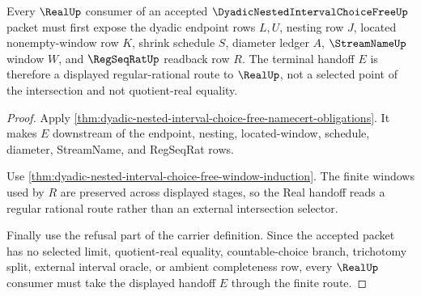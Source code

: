 \begin{theorem}\label{thm:dyadic-nested-interval-choice-free-real-handoff}
Every $\RealUp$ consumer of an accepted $\DyadicNestedIntervalChoiceFreeUp$ packet must first expose the dyadic endpoint rows $L,U$, nesting row $J$, located nonempty-window row $K$, shrink schedule $S$, diameter ledger $A$, $\StreamNameUp$ window $W$, and $\RegSeqRatUp$ readback row $R$. The terminal handoff $E$ is therefore a displayed regular-rational route to $\RealUp$, not a selected point of the intersection and not quotient-real equality.
\end{theorem}
\begin{proof}
Apply \autoref{thm:dyadic-nested-interval-choice-free-namecert-obligations}. It makes $E$ downstream of the endpoint, nesting, located-window, schedule, diameter, StreamName, and RegSeqRat rows.

Use \autoref{thm:dyadic-nested-interval-choice-free-window-induction}. The finite windows used by $R$ are preserved across displayed stages, so the Real handoff reads a regular rational route rather than an external intersection selector.

Finally use the refusal part of the carrier definition. Since the accepted packet has no selected limit, quotient-real equality, countable-choice branch, trichotomy split, external interval oracle, or ambient completeness row, every $\RealUp$ consumer must take the displayed handoff $E$ through the finite route.
\end{proof}




